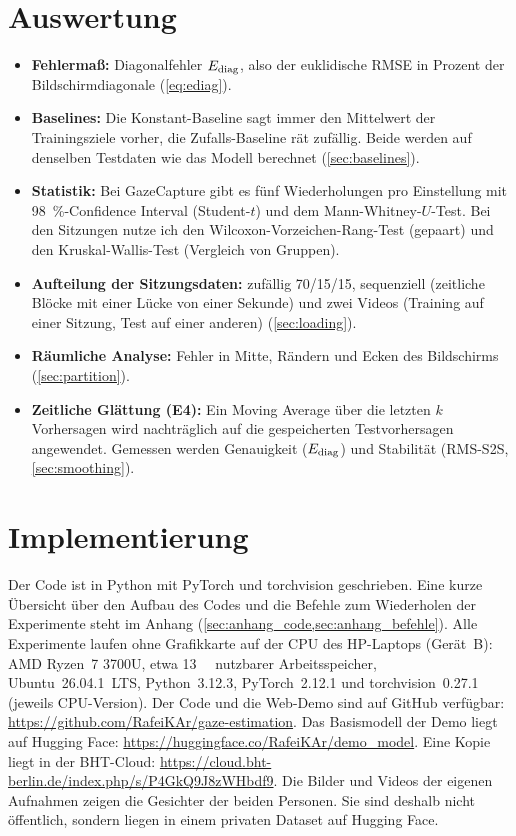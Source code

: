 \section{Auswertung}
\label{sec:meth_evaluation}
\begin{itemize}
  \item \textbf{Fehlermaß:} Diagonalfehler $E_{\mathrm{diag}}$, also der euklidische
        RMSE in Prozent der Bildschirmdiagonale (\cref{eq:ediag}).
  \item \textbf{Baselines:} Die Konstant-Baseline sagt immer den Mittelwert der
        Trainingsziele vorher, die Zufalls-Baseline rät zufällig. Beide werden
        auf denselben Testdaten wie das Modell berechnet
        (\cref{sec:baselines}).
  \item \textbf{Statistik:} Bei GazeCapture gibt es fünf Wiederholungen pro
        Einstellung mit \SI{98}{\percent}-Confidence Interval (Student-$t$)
        und dem Mann-Whitney-$U$-Test. Bei den Sitzungen nutze ich den
        Wilcoxon-Vorzeichen-Rang-Test (gepaart) und den Kruskal-Wallis-Test
        (Vergleich von Gruppen).
  \item \textbf{Aufteilung der Sitzungsdaten:} zufällig 70/15/15, sequenziell
        (zeitliche Blöcke mit einer Lücke von einer Sekunde) und zwei Videos
        (Training auf einer Sitzung, Test auf einer anderen)
        (\cref{sec:loading}).
  \item \textbf{Räumliche Analyse:} Fehler in Mitte, Rändern und Ecken des
        Bildschirms (\cref{sec:partition}).
  \item \textbf{Zeitliche Glättung (E4):} Ein Moving Average über die
        letzten $k$ Vorhersagen wird nachträglich auf die gespeicherten
        Testvorhersagen angewendet. Gemessen werden Genauigkeit ($E_{\mathrm{diag}}$) und
        Stabilität (RMS-S2S, \cref{sec:smoothing}).
\end{itemize}

\section{Implementierung}
\label{sec:meth_implementierung}
Der Code ist in Python mit PyTorch und torchvision geschrieben. Eine kurze
Übersicht über den Aufbau des Codes und die Befehle zum Wiederholen der
Experimente steht im Anhang (\cref{sec:anhang_code,sec:anhang_befehle}).
Alle Experimente laufen ohne Grafikkarte auf der CPU des HP-Laptops
(Gerät~B): AMD Ryzen~7 3700U, etwa \SI{13}{\giga\byte} nutzbarer
Arbeitsspeicher, Ubuntu~26.04.1~LTS, Python~3.12.3, PyTorch~2.12.1 und torchvision~0.27.1
(jeweils CPU-Version). Der Code und die
Web-Demo sind auf GitHub verfügbar:
\url{https://github.com/RafeiKAr/gaze-estimation}. Das Basismodell der Demo liegt auf Hugging Face:
\url{https://huggingface.co/RafeiKAr/demo_model}. Eine Kopie liegt in der
BHT-Cloud: \url{https://cloud.bht-berlin.de/index.php/s/P4GkQ9J8zWHbdf9}. Die
Bilder und Videos der eigenen Aufnahmen zeigen die Gesichter der beiden Personen. Sie sind
deshalb nicht öffentlich, sondern liegen in einem privaten Dataset auf
Hugging Face.


